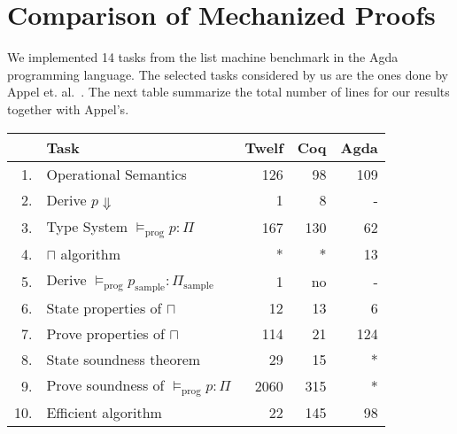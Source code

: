 \documentclass[sigconf]{acmart}
\theoremstyle{definition}
\begin{document}
\section{Comparison of Mechanized Proofs}

We implemented 14 tasks from the list machine benchmark in the Agda programming language.
The selected tasks considered by us are the ones done by Appel et. al.~\cite{Appel07}.
The next table summarize the total number of lines for our results together with Appel's. 

\begin{table}[!htb]
\begin{tabular}{rl|rrr}
    & Task                                         & \multicolumn{1}{l}{Twelf} & \multicolumn{1}{l}{Coq} & \multicolumn{1}{l}{Agda} \\ \hline
1.  & Operational Semantics                        & 126                       & 98                      & 109                      \\
2.  & Derive $p \Downarrow$                        & 1                         & 8                       & -                        \\ \hline
3.  & Type System $\vDash_{\textrm{prog}} p : \Pi$ & 167                       & 130                     & 62                       \\
4.  & $\sqcap$ algorithm                           & *                         & *                       & 13                       \\
5.  & Derive $\vDash_{\textrm{prog}} p_{\textrm{sample}} : \Pi_{\textrm{sample}}$
                                                   & 1                         & no                      & -                        \\
6.  & State properties of $\sqcap$                 & 12                        & 13                      & 6                        \\
7.  & Prove properties of $\sqcap$                 & 114                       & 21                      & 124                      \\
8.  & State soundness theorem                      & 29                        & 15                      & *                        \\
9.  & Prove soundness of $\vDash_{\textrm{prog}} p : \Pi$
                                                   & 2060                      & 315                     & *                        \\ \hline
10. & Efficient algorithm                          & 22                        & 145                     & 98                       \\

\end{tabular}
\end{table}
\end{document}
